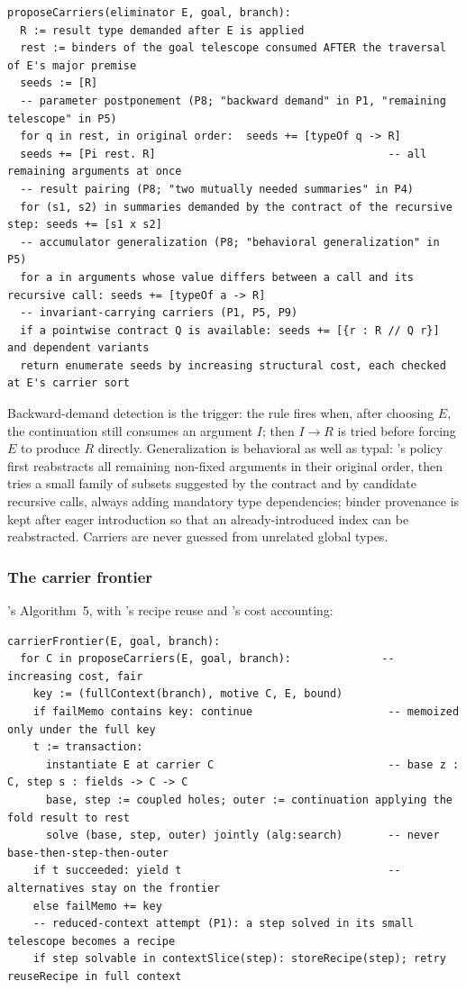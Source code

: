 \begin{lstlisting}
proposeCarriers(eliminator E, goal, branch):
  R := result type demanded after E is applied
  rest := binders of the goal telescope consumed AFTER the traversal of E's major premise
  seeds := [R]
  -- parameter postponement (P8; "backward demand" in P1, "remaining telescope" in P5)
  for q in rest, in original order:  seeds += [typeOf q -> R]
  seeds += [Pi rest. R]                                    -- all remaining arguments at once
  -- result pairing (P8; "two mutually needed summaries" in P4)
  for (s1, s2) in summaries demanded by the contract of the recursive step: seeds += [s1 x s2]
  -- accumulator generalization (P8; "behavioral generalization" in P5)
  for a in arguments whose value differs between a call and its recursive call: seeds += [typeOf a -> R]
  -- invariant-carrying carriers (P1, P5, P9)
  if a pointwise contract Q is available: seeds += [{r : R // Q r}] and dependent variants
  return enumerate seeds by increasing structural cost, each checked at E's carrier sort
\end{lstlisting}

Backward-demand detection is the trigger: the rule fires when, after choosing $E$, the continuation still consumes an argument $I$; then $I \to R$ is tried before forcing $E$ to produce $R$ directly. Generalization is behavioral as well as typal: 's policy first reabstracts all remaining non-fixed arguments in their original order, then tries a small family of subsets suggested by the contract and by candidate recursive calls, always adding mandatory type dependencies; binder provenance is kept after eager introduction so that an already-introduced index can be reabstracted. Carriers are never guessed from unrelated global types.

\subsubsection{The carrier frontier}

's Algorithm~5, with 's recipe reuse and 's cost accounting:

\begin{lstlisting}
carrierFrontier(E, goal, branch):
  for C in proposeCarriers(E, goal, branch):              -- increasing cost, fair
    key := (fullContext(branch), motive C, E, bound)
    if failMemo contains key: continue                     -- memoized only under the full key
    t := transaction:
      instantiate E at carrier C                           -- base z : C, step s : fields -> C -> C
      base, step := coupled holes; outer := continuation applying the fold result to rest
      solve (base, step, outer) jointly (alg:search)       -- never base-then-step-then-outer
    if t succeeded: yield t                                -- alternatives stay on the frontier
    else failMemo += key
    -- reduced-context attempt (P1): a step solved in its small telescope becomes a recipe
    if step solvable in contextSlice(step): storeRecipe(step); retry reuseRecipe in full context
\end{lstlisting}

